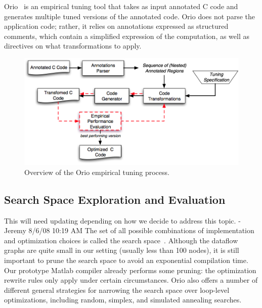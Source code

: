 \documentclass[11pt]{article}
\begin{document}
Orio~\cite{Norris:2007} is an empirical tuning tool that takes as input annotated C code and generates multiple tuned versions of the annotated code. Orio does not parse the application code; rather, it relies on annotations expressed as structured comments, which contain a simplified expression of the computation, as well as directives on what transformations to apply.



\begin{figure}[htbp]
\centering
\includegraphics[width=.7\textwidth]{figures/orio.png}
\caption{Overview of the Orio empirical tuning process.}
\label{fig:orio}
\end{figure}

\subsection{Search Space Exploration and Evaluation}
\label{sec:search}

This will need updating depending on how we decide to address this topic. -Jeremy 8/6/08 10:19 AM
The set of all possible combinations of implementation and optimization choices is called the search space~\cite{Kisuki:2000uq,Triantafyllis:2003uq, Cooper:2005kx}.  Although the dataflow graphs are quite small in our setting (usually less than 100 nodes), it is still important to prune the search space to avoid an exponential compilation time. Our prototype Matlab compiler already performs some pruning: the optimization rewrite rules only apply under certain circumstances. 
%
%
Orio also offers a number of different general strategies for narrowing the search space over loop-level optimizations, including random, simplex, and simulated annealing searches.
\end{document}
